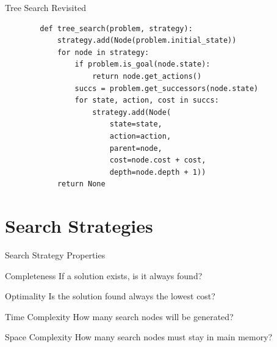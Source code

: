 \documentclass[14pt]{beamer}
\begin{document}
\begin{frame}[fragile]{Tree Search Revisited}
	\footnotesize
	\begin{lstlisting}
		def tree_search(problem, strategy):
		    strategy.add(Node(problem.initial_state))
		    for node in strategy:
		        if problem.is_goal(node.state):
		            return node.get_actions()
		        succs = problem.get_successors(node.state)
		        for state, action, cost in succs:
		            strategy.add(Node(
		                state=state,
		                action=action,
		                parent=node,
		                cost=node.cost + cost,
		                depth=node.depth + 1))
		    return None
	\end{lstlisting}
\end{frame}

\section{Search Strategies}
\begin{frame}[<+->]{Search Strategy Properties}
	\begin{block}{Completeness}
		If a solution exists, is it always found?
	\end{block}
	\begin{block}{Optimality}
		Is the solution found always the lowest cost?
	\end{block}
	\begin{block}{Time Complexity}
		How many search nodes will be generated?
	\end{block}
	\begin{block}{Space Complexity}
		How many search nodes must stay in main memory?
	\end{block}
\end{frame}
\end{document}
